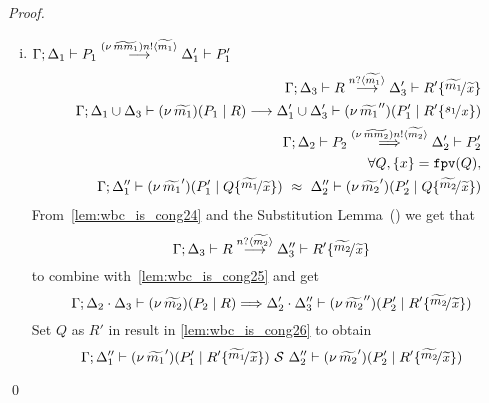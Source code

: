 \begin{proof}
\begin{enumerate}
\begin{enumerate}[i.]
				\item
						$\Gamma; \Delta_1 \vdash P_1 \stackrel{(\nu\, \widetilde{mm_1}) n ! \langle \widetilde{m_1} \rangle}{\longrightarrow} \Delta_1' \vdash P_1'$
						\begin{eqnarray}
							& & \horel{\Gamma}{\Delta_3}{R}
							{\by{\bactinp{n}{\widetilde{m_1}}}}
							{\Delta_3'}{R' \subst{\widetilde{m_1}}{\widetilde{x}}}
							\label{lem:wbc_is_cong24}\\
							& & \horel{\Gamma}{\Delta_1 \cup \Delta_3}{\newsp{\widetilde{m_1}}{P_1 \Par R}}
							{\by{}}
							{\Delta_1' \cup \Delta_3'}{\newsp{\widetilde{m_1}''}{P_1' \Par R' \subst{s_1}{x}}}
							\nonumber \\
							& & \horel{\Gamma}{\Delta_2}{P_2}
							{\By{\news{\widetilde{mm_2}} \bactout{n}{\widetilde{m_2}}}}
							{\Delta_2'}{P_2'}
							\label{lem:wbc_is_cong25}\\
							& & \forall Q, \set{x} = \fpv{Q}, \nonumber \\
							& & \horel{\Gamma}{\Delta_1''}{\newsp{\widetilde{m_1}'}{P_1' \Par Q \subst{\widetilde{m_1}}{\widetilde{x}}}}
							{\ \wbc\ }
							{\Delta_2''}{\newsp{\widetilde{m_2}'}{P_2' \Par Q \subst{\widetilde{m_2}}{\widetilde{x}}}}
							\label{lem:wbc_is_cong26}
						\end{eqnarray}
						From~\eqref{lem:wbc_is_cong24} and the Substitution Lemma~() we get that
						\[
							\horel{\Gamma}{\Delta_3}{R}{\by{\bactinp{n}{\widetilde{m_2}}}}{\Delta_3''}{R' \subst{\widetilde{m_2}}{\widetilde{x}}}
						\]
						\noi to combine with~\eqref{lem:wbc_is_cong25} and get
						\[
							\horel{\Gamma}{\Delta_2 \cat \Delta_3}{\newsp{\widetilde{m_2}}{P_2 \Par R}}
							{\By{}}
							{\Delta_2' \cat \Delta_3''}{\newsp{\widetilde{m_2}''}{P_2' \Par R' \subst{\widetilde{m_2}}{\widetilde{x}}}}
						\]
						\noi Set $Q$ as $R'$ in result in \eqref{lem:wbc_is_cong26} to obtain
						\[
							\horel{\Gamma}{\Delta_1''}{\newsp{\widetilde{m_1}'}{P_1' \Par R' \subst{\widetilde{m_1}}{\widetilde{x}}}}
							{\ \mathcal{S}\ }
							{\Delta_2''}{\newsp{\widetilde{m_2}'}{P_2' \Par R' \subst{\widetilde{m_2}}{\widetilde{x}}}}
						\]
		\end{enumerate}
	\end{enumerate}
	\qed
\end{proof}


